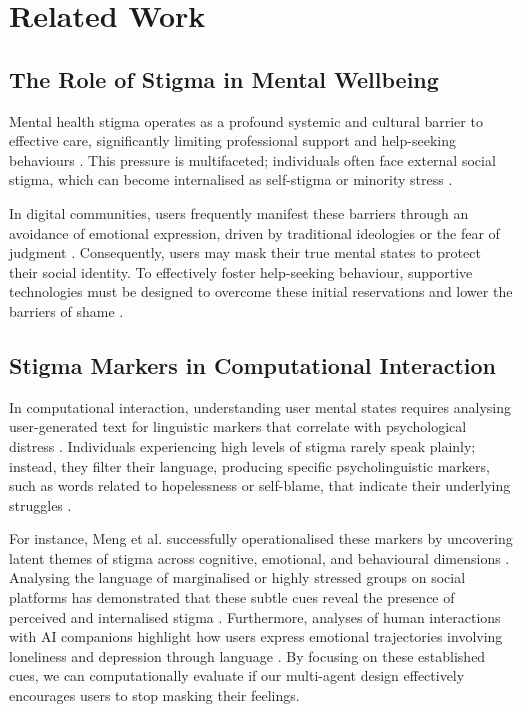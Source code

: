 \documentclass[sigconf]{acmart}
\begin{document}
\section{Related Work}

\subsection{The Role of Stigma in Mental Wellbeing}
Mental health stigma operates as a profound systemic and cultural barrier to effective care, significantly limiting professional support and help-seeking behaviours \cite{Sehgal2025AdolescentChatbots}. This pressure is multifaceted; individuals often face external social stigma, which can become internalised as self-stigma or minority stress \cite{Saha2019LGBTQ, Sehgal2025AdolescentChatbots}. 

In digital communities, users frequently manifest these barriers through an avoidance of emotional expression, driven by traditional ideologies or the fear of judgment \cite{Ammari2026RedditInfertility}. Consequently, users may mask their true mental states to protect their social identity. To effectively foster help-seeking behaviour, supportive technologies must be designed to overcome these initial reservations and lower the barriers of shame \cite{Sien2025DigitalHumanLibrary}.

\subsection{Stigma Markers in Computational Interaction}
In computational interaction, understanding user mental states requires analysing user-generated text for linguistic markers that correlate with psychological distress \cite{Rissola2021MentalStateSurvey}. Individuals experiencing high levels of stigma rarely speak plainly; instead, they filter their language, producing specific psycholinguistic markers, such as words related to hopelessness or self-blame, that indicate their underlying struggles \cite{Saduakassova2026SuicidePrevention}. 

For instance, Meng et al. successfully operationalised these markers by uncovering latent themes of stigma across cognitive, emotional, and behavioural dimensions \cite{Meng2026CHALET}. Analysing the language of marginalised or highly stressed groups on social platforms has demonstrated that these subtle cues reveal the presence of perceived and internalised stigma \cite{Saha2019LGBTQ}. Furthermore, analyses of human interactions with AI companions highlight how users express emotional trajectories involving loneliness and depression through language \cite{Yuan2026Replika}. By focusing on these established cues, we can computationally evaluate if our multi-agent design effectively encourages users to stop masking their feelings.
\end{document}

